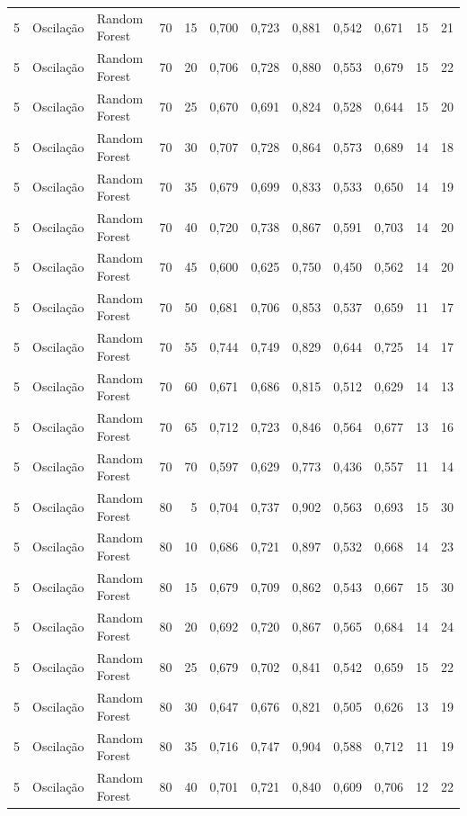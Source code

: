 \begin{longtable}{@{}rllrrrrrrrrr@{}}
5 & Oscilação & Random Forest & 70 & 15 & 0,700 & 0,723 & 0,881 & 0,542 & 0,671 & 15 & 21 \\
5 & Oscilação & Random Forest & 70 & 20 & 0,706 & 0,728 & 0,880 & 0,553 & 0,679 & 15 & 22 \\
5 & Oscilação & Random Forest & 70 & 25 & 0,670 & 0,691 & 0,824 & 0,528 & 0,644 & 15 & 20 \\
5 & Oscilação & Random Forest & 70 & 30 & 0,707 & 0,728 & 0,864 & 0,573 & 0,689 & 14 & 18 \\
5 & Oscilação & Random Forest & 70 & 35 & 0,679 & 0,699 & 0,833 & 0,533 & 0,650 & 14 & 19 \\
5 & Oscilação & Random Forest & 70 & 40 & 0,720 & 0,738 & 0,867 & 0,591 & 0,703 & 14 & 20 \\
5 & Oscilação & Random Forest & 70 & 45 & 0,600 & 0,625 & 0,750 & 0,450 & 0,562 & 14 & 20 \\
5 & Oscilação & Random Forest & 70 & 50 & 0,681 & 0,706 & 0,853 & 0,537 & 0,659 & 11 & 17 \\
5 & Oscilação & Random Forest & 70 & 55 & 0,744 & 0,749 & 0,829 & 0,644 & 0,725 & 14 & 17 \\
5 & Oscilação & Random Forest & 70 & 60 & 0,671 & 0,686 & 0,815 & 0,512 & 0,629 & 14 & 13 \\
5 & Oscilação & Random Forest & 70 & 65 & 0,712 & 0,723 & 0,846 & 0,564 & 0,677 & 13 & 16 \\
5 & Oscilação & Random Forest & 70 & 70 & 0,597 & 0,629 & 0,773 & 0,436 & 0,557 & 11 & 14 \\
5 & Oscilação & Random Forest & 80 & 5 & 0,704 & 0,737 & 0,902 & 0,563 & 0,693 & 15 & 30 \\
5 & Oscilação & Random Forest & 80 & 10 & 0,686 & 0,721 & 0,897 & 0,532 & 0,668 & 14 & 23 \\
5 & Oscilação & Random Forest & 80 & 15 & 0,679 & 0,709 & 0,862 & 0,543 & 0,667 & 15 & 30 \\
5 & Oscilação & Random Forest & 80 & 20 & 0,692 & 0,720 & 0,867 & 0,565 & 0,684 & 14 & 24 \\
5 & Oscilação & Random Forest & 80 & 25 & 0,679 & 0,702 & 0,841 & 0,542 & 0,659 & 15 & 22 \\
5 & Oscilação & Random Forest & 80 & 30 & 0,647 & 0,676 & 0,821 & 0,505 & 0,626 & 13 & 19 \\
5 & Oscilação & Random Forest & 80 & 35 & 0,716 & 0,747 & 0,904 & 0,588 & 0,712 & 11 & 19 \\
5 & Oscilação & Random Forest & 80 & 40 & 0,701 & 0,721 & 0,840 & 0,609 & 0,706 & 12 & 22 \\

\end{longtable}
